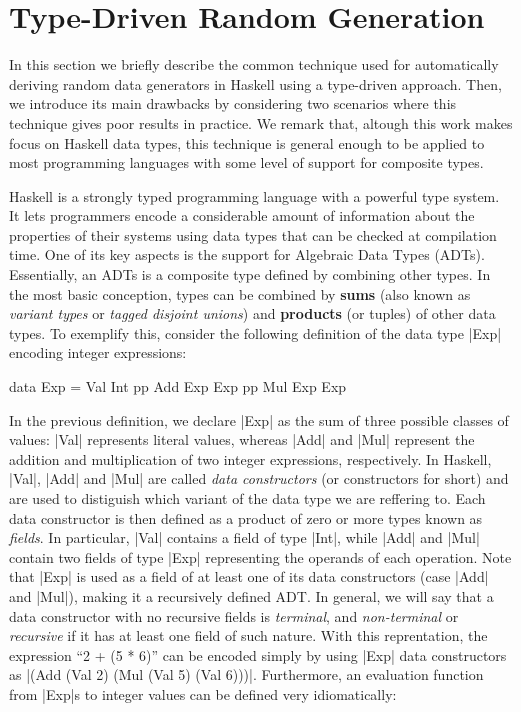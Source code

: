 \section{Type-Driven Random Generation} \label{sec:randomtesting}

In this section we briefly describe the common technique used for automatically
deriving random data generators in Haskell using a type-driven approach.
%
Then, we introduce its main drawbacks by considering two scenarios where this
technique gives poor results in practice.
%
We remark that, altough this work makes focus on Haskell data types, this
technique is general enough to be applied to most programming languages with
some level of support for composite types.


Haskell is a strongly typed programming language with a powerful type system.
%
It lets programmers encode a considerable amount of information about the
properties of their systems using data types that can be checked at compilation
time.
%
One of its key aspects is the support for Algebraic Data Types (ADTs).
%
Essentially, an ADTs is a composite type defined by combining other types.
%
In the most basic conception, types can be combined by \textbf{sums} (also known
as \emph{variant types} or \emph{tagged disjoint unions}) and \textbf{products}
(or tuples) of other data types.
%
To exemplify this, consider the following definition of the data type |Exp|
encoding integer expressions:

\begin{code}
data Exp  =   Val  Int
          pp  Add  Exp  Exp
          pp  Mul  Exp  Exp
\end{code}

In the previous definition, we declare |Exp| as the sum of three possible
classes of values: |Val| represents literal values, whereas |Add| and |Mul|
represent the addition and multiplication of two integer expressions,
respectively.
%
In Haskell, |Val|, |Add| and |Mul| are called \emph{data constructors} (or
constructors for short) and are used to distiguish which variant of the data
type we are reffering to.
%
Each data constructor is then defined as a product of zero or more types known
as \emph{fields}.
%
In particular, |Val| contains a field of type |Int|, while |Add| and |Mul|
contain two fields of type |Exp| representing the operands of each operation.
%
Note that |Exp| is used as a field of at least one of its data constructors
(case |Add| and |Mul|), making it a recursively defined ADT.
%
In general, we will say that a data constructor with no recursive fields is
\emph{terminal}, and \emph{non-terminal} or \emph{recursive} if it has at least
one field of such nature.
%
With this reprentation, the expression ``2 + (5 * 6)'' can be encoded simply by
using |Exp| data constructors as |(Add (Val 2) (Mul (Val 5) (Val 6)))|.
%
Furthermore, an evaluation function from |Exp|s to integer values can be defined
very idiomatically:

